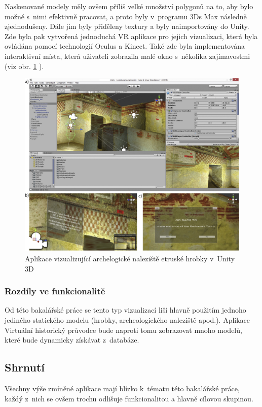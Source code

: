 \documentclass[thesis=B,czech]{FITthesis}[2012/06/26]
\begin{document}
	Naskenované modely měly ovšem příliš velké množství polygonů na to, aby bylo možné s~nimi efektivně pracovat, a proto byly v~programu 3Ds Max následně zjednodušeny. Dále jim byly přiděleny textury a byly naimportovány do Unity. Zde byla pak vytvořená jednoduchá VR aplikace pro jejich vizualizaci, která byla ovládána pomocí technologií Oculus a Kinect. Také zde byla implementována interaktivní místa, která uživateli zobrazila malé okno s~několika zajímavostmi (viz obr. \ref{fig:tomb} ). \cite{tombs}
	
	\begin{figure}
  		\includegraphics{tomb.jpg}
  		\caption{Aplikace vizualizující archelogické naleziště etruské hrobky v~Unity 3D \cite{tombs}}
  		\label{fig:tomb}
	\end{figure}

        \subsubsection{Rozdíly ve funkcionalitě}
Od této bakalářské práce se tento typ vizualizací liší hlavně použitím jednoho jediného statického modelu (hrobky, archeologického naleziště apod.). Aplikace Virtuální historický průvodce bude naproti tomu zobrazovat mnoho modelů, které bude dynamicky získávat z~databáze.

\subsection{Shrnutí}
 Všechny výše zmíněné aplikace mají blízko k~tématu této bakalářské práce, každý z~nich se ovšem trochu odlišuje funkcionalitou a hlavně cílovou skupinou.
 
\end{document}
